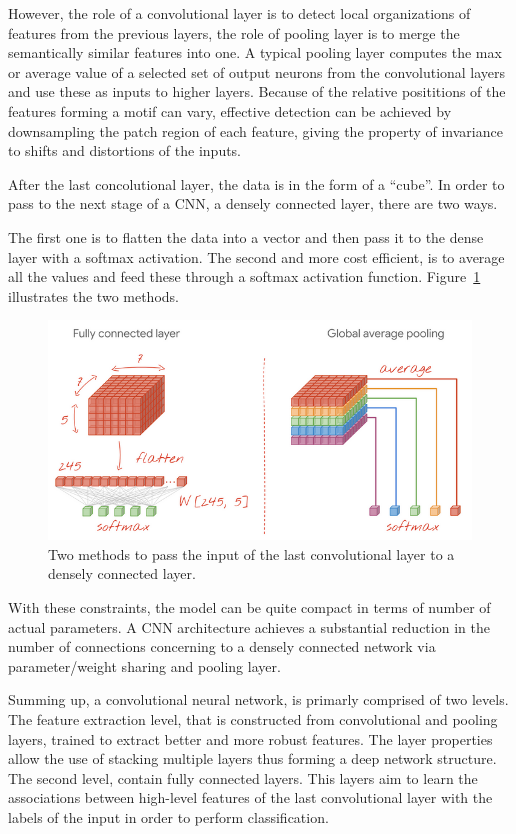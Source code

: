 However, the role of a convolutional layer is to detect local organizations of features from the previous layers, the role of pooling layer is to merge the semantically similar features into one. A typical pooling layer computes the max or average value of a selected set of output neurons from the convolutional layers and use these as inputs to higher layers.
Because of the relative posititions of the features forming a motif can vary, effective detection can be achieved by downsampling the patch region of each feature, giving the property of invariance to shifts and distortions of the inputs.

After the last concolutional layer, the data is in the form of a ``cube''. In order to pass to the next stage of a CNN, a densely connected layer, there are two ways.

The first one is to flatten the data into a vector and then pass it to the dense layer with a softmax activation.
The second and more cost efficient, is to average all the values and feed these through a softmax activation function. Figure~\ref{c3:fig_flatten_global} illustrates the two methods.

\begin{figure}[h!]
    \centering  
    \includegraphics[width=.7\textwidth]{figures/chap3/cnn/flatten_global}
    \caption{Two methods to pass the input of the last convolutional layer to a densely connected layer.}
    \label{c3:fig_flatten_global}
\end{figure}


With these constraints, the model can be quite compact in terms of number of actual parameters. A CNN architecture achieves a substantial reduction in the number of connections concerning to a densely connected network via parameter/weight sharing and pooling layer.

Summing up, a convolutional neural network, is primarly comprised of two levels. The feature extraction level, that is constructed from convolutional and pooling layers, trained to extract better and more robust features. The layer properties allow the use of stacking multiple layers thus forming a deep network structure.
The second level, contain fully connected layers. This layers aim to learn the associations between high-level features of the last convolutional layer with the labels of the input in order to perform classification.

